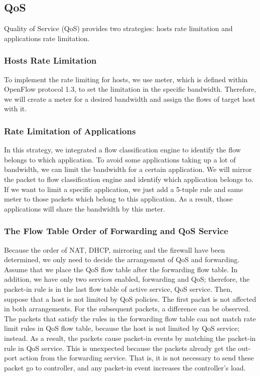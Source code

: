 \documentclass[conference]{IEEEtran}
\begin{document}
\subsection{QoS}
Quality of Service (QoS) provides two strategies: hosts rate limitation and applications rate limitation.

\subsubsection{Hosts Rate Limitation}
To implement the rate limiting for hosts, we use meter, which is defined within OpenFlow protocol 1.3, to set the limitation in the specific bandwidth. Therefore, we will create a meter for a desired bandwidth and assign the flows of target host with it.


\subsubsection{Rate Limitation of Applications}

In this strategy, we integrated a flow classification engine to identify the flow belongs to which application.
To avoid some applications taking up a lot of bandwidth, we can limit the bandwidth for a certain application.
We will mirror the packet to flow classification engine and identify which application belongs to.
If we want to limit a specific application, we just add a 5-tuple rule and same meter to those packets which belong to this application.
As a result, those applications will share the bandwidth by this meter.

\subsubsection{The Flow Table Order of Forwarding and QoS Service}
Because the order of NAT, DHCP, mirroring and the firewall have been determined, we only need to decide the arrangement of QoS and forwarding. Assume that we place the QoS flow table after the forwarding flow table. In addition, we have only two services enabled, forwarding and QoS; therefore, the packet-in rule is in the last flow table of active service, QoS service. Then, suppose that a host is not limited by QoS policies. The first packet is not affected in both arrangements. For the subsequent packets, a difference can be observed. The packets that satisfy the rules in the forwarding flow table can not match rate limit rules in QoS flow table, because the host is not limited by QoS service; instead. As a result, the packets cause packet-in events by matching the packet-in rule in QoS service. This is unexpected because the packets already get the out-port action from the forwarding service. That is, it is not necessary to send these packet go to controller, and any packet-in event increases the controller’s load.
\end{document}
